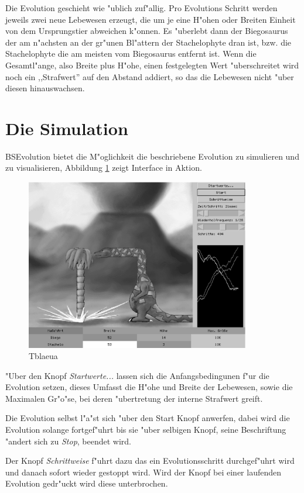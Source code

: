 \documentclass[a4paper]{article}
\begin{document}
Die Evolution geschieht wie "ublich zuf"allig. Pro Evolutions Schritt
werden jeweils zwei neue Lebewesen erzeugt, die um je eine H"ohen oder
Breiten Einheit von dem Ursprungstier abweichen k"onnen. Es "uberlebt
dann der Biegosaurus der am n"achsten an der gr"unen Bl"attern der
Stachelophyte dran ist, bzw. die Stachelophyte die am meisten vom
Biegosaurus entfernt ist. Wenn die Gesamtl"ange, also Breite plus
H"ohe, einen festgelegten Wert "uberschreitet wird noch ein
,,Strafwert'' auf den Abstand addiert, so das die Lebewesen nicht
"uber diesen hinauswachsen.


\section{Die Simulation}

BSEvolution bietet die M"oglichkeit die beschriebene Evolution zu
simulieren und zu visualisieren, Abbildung \ref{bsgui} zeigt
Interface in Aktion.

\begin{figure}[h]
\centerline{\includegraphics[height=75mm]{bsevolution_gui.ps}}
\caption{Tblaeua}
\label{bsgui}
\end{figure}

"Uber den Knopf \emph{Startwerte...} lassen sich die Anfangsbedingunen
f"ur die Evolution setzen, dieses Umfasst die H"ohe und Breite der
Lebewesen, sowie die Maximalen Gr"o"se, bei deren "ubertretung der
interne Strafwert greift.

Die Evolution selbst l"a"st sich "uber den Start Knopf anwerfen, dabei
wird die Evolution solange fortgef"uhrt bis sie "uber selbigen Knopf,
seine Beschriftung "andert sich zu \emph{Stop}, beendet wird.

Der Knopf \emph{Schrittweise} f"uhrt dazu das ein Evolutionsschritt
durchgef"uhrt wird und danach sofort wieder gestoppt wird. Wird der
Knopf bei einer laufenden Evolution gedr"uckt wird diese unterbrochen.
\end{document}
